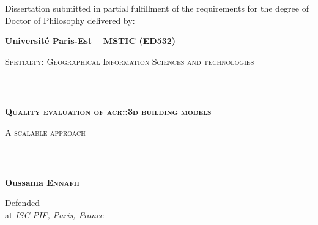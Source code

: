 \emptypage

\begin{titlepage}
    \begin{center}
        \begin{small}
            Dissertation submitted in partial fulfillment of the requirements for the degree of Doctor of Philosophy delivered by:
        \end{small}

        \vspace*{5mm}

        \begin{Large}
            \textbf{Université Paris-Est -- MSTIC (ED532)}
        \end{Large}

        \vspace*{10mm}
        \begin{large}
            \textsc{Spetialty: Geographical Information Sciences and technologies}
        \end{large}

        \vspace*{15mm}

        \rule{\textwidth}{1.5pt}\\
        \begin{LARGE}
            \textsc{\textbf{Quality evaluation of \texorpdfstring{\acrshort*{acr::3d}}{3D} building models}}\\
        \end{LARGE}
        \vspace*{2.5mm}
        \begin{Large}
            \textsc{A scalable approach}
        \end{Large}
        \rule{\textwidth}{1.5pt}\\

        \vspace*{15mm}

        \begin{large}
            \textbf{Oussama \textsc{Ennafii}}
        \end{large}

        \vfill

        Defended \textit{} \\
        at \textit{ISC-PIF, Paris, France}

        \vfill


\end{center}
\end{titlepage}
